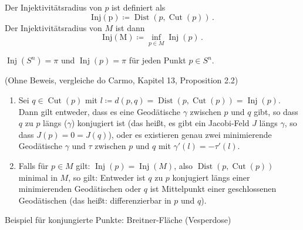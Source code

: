 \documentclass[a4paper,twoside,DIV15,BCOR12mm]{scrbook}
\renewcommand{\da}{\coloneqq}
\DeclareMathOperator{\cut}{Cut}
\DeclareMathOperator{\inj}{Inj}
\DeclareMathOperator{\dist}{Dist}
\begin{document}
\begin{definition}
Der Injektivitätsradius von $p$ ist definiert als
\[ \operatorname{Inj(p)} \da \dist (p,\cut(p))\,. \]
Der Injektivitätsradius von $M$ ist dann
\[ \operatorname{Inj(M)} \da \inf_{p\in M} \inj (p)\,.\]
\end{definition}

\begin{beispiel}
$\inj (S^n) = \pi$ und $\inj (p) = \pi$ für jeden Punkt $p \in S^n$.
\end{beispiel}


\begin{satz}
(Ohne Beweis, vergleiche do Carmo, Kapitel 13, Proposition 2.2)

\begin{enumerate}
\item Sei $q\in \cut(p)$ mit $l\da d(p,q) = \dist (p,\cut(p)) = \inj (p)$. Dann gilt entweder, dass es eine Geodätische $\gamma$ zwischen $p$ und $q$ gibt, so dass $q$ zu $p$ längs ($\gamma$) konjugiert ist (das heißt, es gibt ein Jacobi-Feld $J$ längs $\gamma$, so dass $J(p)=0=J(q)$), oder es existieren genau zwei minimierende Geodätische $\gamma$ und $\tau$ zwischen $p$ und $q$ mit $\gamma'(l) = - \tau'(l)$.
\item Falls für $p\in M$ gilt: $\inj(p)=\inj(M)$, also $\dist(p,\cut(p))$ minimal in $M$, so gilt: Entweder ist $q$ zu $p$ konjugiert längs einer minimierenden Geodätischen oder $q$ ist Mittelpunkt einer geschlossenen Geodätischen (das heißt: differenzierbar in $p$ und $q$).
\end{enumerate}
\end{satz}

Beispiel für konjungierte Punkte: Breitner-Fläche (Vesperdose)
\end{document}
